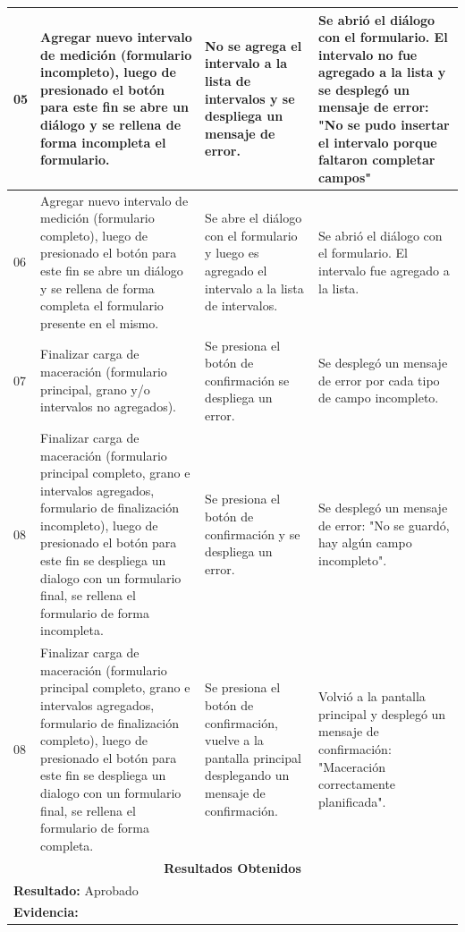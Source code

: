 \begin{minipage}{0.95\textwidth}
\begin{center}
\begin{tabularx}{\textwidth}{ | p{2cm} | X | X | X |}
        \hline
        05 & Agregar nuevo intervalo de medición (formulario incompleto), luego de presionado el botón para este fin se abre un diálogo y se rellena de forma incompleta el formulario.  & No se agrega el intervalo a la lista de intervalos y se despliega un mensaje de error. & Se abrió el diálogo con el formulario. El intervalo no fue agregado a la lista y se desplegó un mensaje de error: "No se pudo insertar el intervalo porque faltaron completar campos" \\
        \hline
        06 & Agregar nuevo intervalo de medición (formulario completo), luego de presionado el botón para este fin se abre un diálogo y se rellena de forma completa el formulario presente en el mismo. & Se abre el diálogo con el formulario y luego es agregado el intervalo a la lista de intervalos. & Se abrió el diálogo con el formulario. El intervalo fue agregado a la lista.\\
        \hline
        07 & Finalizar carga de maceración (formulario principal, grano y/o intervalos no agregados). & Se presiona el botón de confirmación se despliega un error. & Se desplegó un mensaje de error por cada tipo de campo incompleto.\\
        \hline
        08 & Finalizar carga de maceración (formulario principal completo, grano e intervalos agregados, formulario de finalización incompleto), luego de presionado el botón para este fin se despliega un dialogo con un formulario final, se rellena el formulario de forma incompleta. & Se presiona el botón de confirmación y se despliega un error. & Se desplegó un mensaje de error: "No se guardó, hay algún campo incompleto".\\
        \hline
        08 & Finalizar carga de maceración (formulario principal completo, grano e intervalos agregados, formulario de finalización completo), luego de presionado el botón para este fin se despliega un dialogo con un formulario final, se rellena el formulario de forma completa. & Se presiona el botón de confirmación, vuelve a la pantalla principal desplegando un mensaje de confirmación. & Volvió a la pantalla principal y desplegó un mensaje de confirmación: "Maceración correctamente planificada".\\
        \hline
        \multicolumn{4}{|c|}{\textbf{Resultados Obtenidos}} \\
        \hline
        \multicolumn{4}{|l|}{\textbf{Resultado:} Aprobado} \\
        \hline
        \multicolumn{4}{|l|}{\textbf{Evidencia: }} \\
        \hline
     \end{tabularx}
    \label{CP002}
    \end{center}
    \end{minipage}
    
